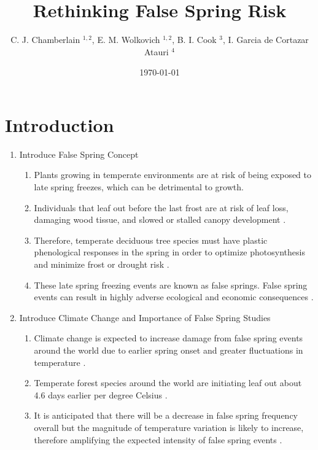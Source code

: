\documentclass{article}\usepackage[]{graphicx}\usepackage[]{color}
\begin{document}
\title{Rethinking False Spring Risk}
\author{C. J. Chamberlain $^{1,2}$, E. M. Wolkovich $^{1,2}$, B. I. Cook $^{3}$, I. Garcia de Cortazar Atauri $^{4}$}
\date{\today}
\maketitle 
 

\renewcommand{\thetable}{\arabic{table}}
\renewcommand{\thefigure}{\arabic{figure}}
\renewcommand{\labelitemi}{$-$}

\section*{Introduction}
\begin{enumerate}
\item Introduce False Spring Concept
\begin {enumerate}
\item Plants growing in temperate environments are at risk of being exposed to late spring freezes, which can be detrimental to growth. 
\item Individuals that leaf out before the last frost are at risk of leaf loss, damaging wood tissue, and slowed or stalled canopy development \citep{Gu2008, Hufkens2012}. 
\item Therefore, temperate deciduous tree species must have plastic phenological responses in the spring in order to optimize photosynthesis and minimize frost or drought risk \citep{Polgar2011}. 
\item These late spring freezing events are known as false springs. False spring events can result in highly adverse ecological and economic consequences \citep{Knudson2012, Ault2013}.
\end{enumerate}
\item Introduce Climate Change and Importance of False Spring Studies
\begin{enumerate}
\item Climate change is expected to increase damage from false spring events around the world due to earlier spring onset and greater fluctuations in temperature \citep{Cannell1986, Inouye2008, Martin2010}. 
\item Temperate forest species around the world are initiating leaf out about 4.6 days earlier per degree Celsius \citep{Wolkovich2012, Polgar2014}. 
\item It is anticipated that there will be a decrease in false spring frequency overall but the magnitude of temperature variation is likely to increase, therefore amplifying the expected intensity of false spring events \citep{Kodra2011, Allstadt2015}. 

\end{enumerate}
\end{enumerate}
\end{document}
